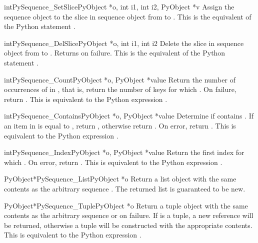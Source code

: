 \begin{cfuncdesc}{int}{PySequence_SetSlice}{PyObject *o, int i1,
                                            int i2, PyObject *v}
  Assign the sequence object  to the slice in sequence object
   from  to .  This is the equivalent of the
  Python statement .
\end{cfuncdesc}

\begin{cfuncdesc}{int}{PySequence_DelSlice}{PyObject *o, int i1, int i2}
  Delete the slice in sequence object  from  to
  .  Returns  on failure.  This is the equivalent of
  the Python statement .
\end{cfuncdesc}

\begin{cfuncdesc}{int}{PySequence_Count}{PyObject *o, PyObject *value}
  Return the number of occurrences of  in , that is,
  return the number of keys for which .  On failure, return .  This is equivalent to
  the Python expression .
\end{cfuncdesc}

\begin{cfuncdesc}{int}{PySequence_Contains}{PyObject *o, PyObject *value}
  Determine if  contains .  If an item in  is
  equal to , return , otherwise return .
  On error, return .  This is equivalent to the Python
  expression .
\end{cfuncdesc}

\begin{cfuncdesc}{int}{PySequence_Index}{PyObject *o, PyObject *value}
  Return the first index  for which .  On error, return .    This is equivalent to
  the Python expression .
\end{cfuncdesc}

\begin{cfuncdesc}{PyObject*}{PySequence_List}{PyObject *o}
  Return a list object with the same contents as the arbitrary
  sequence .  The returned list is guaranteed to be new.
\end{cfuncdesc}

\begin{cfuncdesc}{PyObject*}{PySequence_Tuple}{PyObject *o}
  Return a tuple object with the same contents as the arbitrary
  sequence  or \NULL{} on failure.  If  is a tuple,
  a new reference will be returned, otherwise a tuple will be
  constructed with the appropriate contents.  This is equivalent
  to the Python expression .
\end{cfuncdesc}

